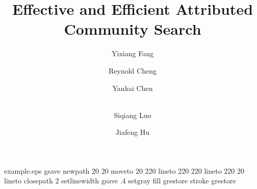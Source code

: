 \begin{filecontents*}{example.eps}
gsave
newpath
  20 20 moveto
  20 220 lineto
  220 220 lineto
  220 20 lineto
closepath
2 setlinewidth
gsave
  .4 setgray fill
grestore
stroke
grestore
\end{filecontents*}
%
\RequirePackage{fix-cm}
%
\documentclass[twocolumn]{svjour3}          %
%
\smartqed  %
%

\let\proof\relax
\let\endproof\relax

\usepackage{graphicx}
\usepackage{balance}

\usepackage{color}
\usepackage[noend]{algpseudocode}
\usepackage{algorithm}
\usepackage{varwidth}
\usepackage{url}
\usepackage{multirow}
\usepackage{subfigure}
\usepackage{mathtools}
\usepackage{amsmath,bm}
\usepackage{hyperref}
\usepackage{amsthm}

\usepackage{indentfirst}

\renewcommand{\arraystretch}{1.18}

\newtheorem{variant}{Variant}

\newcommand{\fang}[1]{{\color{red}[\textbf{Yixiang:} #1]}}
\newcommand{\rey}[1]{{\color{blue}[\textbf{Reynold:} #1]}}
\newcommand{\luo}[1]{{\color{purple}[\textbf{Siqiang:} #1]}}
\newcommand{\hu}[1]{{\color{green}[\textbf{Jiafeng:} #1]}}
\newcommand{\chen}[1]{{\color{blue}[\textbf{Yankai:} #1]}}

\newcommand{\tabincell}[2]{\begin{tabular}{@{}#1@{}}#2\end{tabular}}





\title{Effective and Efficient Attributed Community Search}


\author{Yixiang Fang         \and
        Reynold Cheng        \and
        Yankai Chen          \and \\
        Siqiang Luo          \and
        Jiafeng Hu
}

